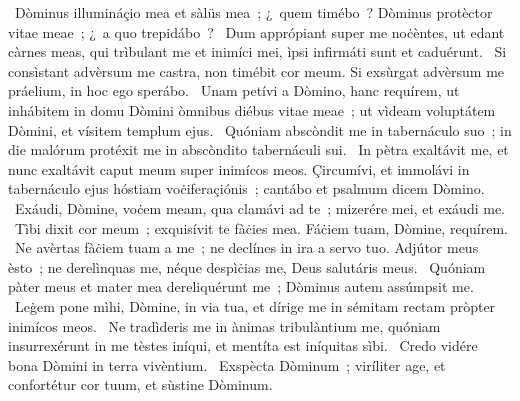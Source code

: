\psalmChapterWithInscription{}
{ }
{%
~Dòminus illumináçio mea et sàlüs mea~; ¿~quem timébo~? Dòminus protèctor vitae meae~; ¿~a quo trepidábo~? 
~Dum apprópiant super me noċèntes, ut edant càrnes meas, qui trìbulant me et inimíci mei, ìpsi infirmáti sunt et caduérunt. 
~Si consìstant advèrsum me castra, non timébit cor meum. Si exsùrgat advèrsum me práelium, in hoc ego sperábo. 
~Unam petívi a Dòmino, hanc requírem, ut inhábitem in domu Dòmini òmnibus diébus vitae meae~; ut vìdeam voluptátem Dòmini, et vísitem templum ejus. 
~Quóniam abscòndit me in tabernáculo suo~; in die malórum protéxit me in abscòndito tabernáculi sui. 
~In pètra exaltávit me, et nunc exaltávit caput meum super inimícos meos. Çircumívi, et immolávi in tabernáculo ejus hóstiam voċiferaçiónis~; cantábo et psalmum dicem Dòmino. 
~Exáudi, Dòmine, voċem meam, qua clamávi ad te~; mizerére mei, et exáudi me. 
~Tìbi dixit cor meum~; exquisívit te fàċies mea. Fáċiem tuam, Dòmine, requírem. 
~Ne avèrtas fàċiem tuam a me~; ne declínes in ira a servo tuo. Adjútor meus èsto~; ne derelìnquas me, néque despìċias me, Deus salutáris meus. 
~Quóniam pàter meus et mater mea dereliquérunt me~; Dòminus autem assúmpsit me. 
~Leġem pone mìhi, Dòmine, in via tua, et dírige me in sémitam rectam pròpter inimícos meos. 
~Ne tradìderis me in ànimas tribulàntium me, quóniam insurrexérunt in me tèstes iníqui, et mentíta est iníquitas sìbi. 
~Credo vidére bona Dòmini in terra vivèntium. 
~Exspècta Dòminum~; viríliter age, et confortétur cor tuum, et sùstine Dòminum. 
}
